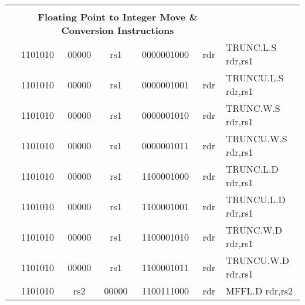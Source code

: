 \begin{table}[p]
\begin{small}
\begin{center}
\begin{tabular}{rcccccccccl}
&
\multicolumn{9}{c}{} & \\
&
\multicolumn{9}{c}{\bf Floating Point to Integer Move \& Conversion Instructions} & \\
\cline{2-10}
  

&
\multicolumn{2}{|c|}{1101010} &
\multicolumn{1}{c|}{00000} &
\multicolumn{1}{c|}{rs1} &
\multicolumn{4}{c|}{0000001000} &
\multicolumn{1}{c|}{rdr} & TRUNC.L.S rdr,rs1 \\
\cline{2-10}
  

&
\multicolumn{2}{|c|}{1101010} &
\multicolumn{1}{c|}{00000} &
\multicolumn{1}{c|}{rs1} &
\multicolumn{4}{c|}{0000001001} &
\multicolumn{1}{c|}{rdr} & TRUNCU.L.S rdr,rs1 \\
\cline{2-10}
  

&
\multicolumn{2}{|c|}{1101010} &
\multicolumn{1}{c|}{00000} &
\multicolumn{1}{c|}{rs1} &
\multicolumn{4}{c|}{0000001010} &
\multicolumn{1}{c|}{rdr} & TRUNC.W.S rdr,rs1 \\
\cline{2-10}
  

&
\multicolumn{2}{|c|}{1101010} &
\multicolumn{1}{c|}{00000} &
\multicolumn{1}{c|}{rs1} &
\multicolumn{4}{c|}{0000001011} &
\multicolumn{1}{c|}{rdr} & TRUNCU.W.S rdr,rs1 \\
\cline{2-10}
  

&
\multicolumn{2}{|c|}{1101010} &
\multicolumn{1}{c|}{00000} &
\multicolumn{1}{c|}{rs1} &
\multicolumn{4}{c|}{1100001000} &
\multicolumn{1}{c|}{rdr} & TRUNC.L.D rdr,rs1 \\
\cline{2-10}
  

&
\multicolumn{2}{|c|}{1101010} &
\multicolumn{1}{c|}{00000} &
\multicolumn{1}{c|}{rs1} &
\multicolumn{4}{c|}{1100001001} &
\multicolumn{1}{c|}{rdr} & TRUNCU.L.D rdr,rs1 \\
\cline{2-10}
  

&
\multicolumn{2}{|c|}{1101010} &
\multicolumn{1}{c|}{00000} &
\multicolumn{1}{c|}{rs1} &
\multicolumn{4}{c|}{1100001010} &
\multicolumn{1}{c|}{rdr} & TRUNC.W.D rdr,rs1 \\
\cline{2-10}
  

&
\multicolumn{2}{|c|}{1101010} &
\multicolumn{1}{c|}{00000} &
\multicolumn{1}{c|}{rs1} &
\multicolumn{4}{c|}{1100001011} &
\multicolumn{1}{c|}{rdr} & TRUNCU.W.D rdr,rs1 \\
\cline{2-10}
  

&
\multicolumn{2}{|c|}{1101010} &
\multicolumn{1}{c|}{rs2} &
\multicolumn{1}{c|}{00000} &
\multicolumn{4}{c|}{1100111000} &
\multicolumn{1}{c|}{rdr} & MFFL.D rdr,rs2 \\
\cline{2-10}
  


\end{tabular}
\end{center}
\end{small}
\end{table}
